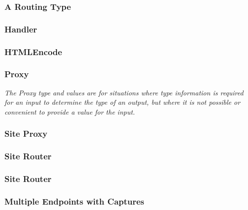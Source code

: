 \begin{frame}
  \frametitle{A Routing Type}
  
\end{frame}

\begin{frame}
  \frametitle{Handler}
  
\end{frame}

\begin{frame}
  \frametitle{HTMLEncode}
  
\end{frame}

\begin{frame}
  \frametitle{Proxy}
  \textit{
  The Proxy type and values are for situations where type information is
  required for an input to determine the type of an output, but where it is not
  possible or convenient to provide a value for the input.}
\end{frame}

\begin{frame}
  \frametitle{Site Proxy}
  
\end{frame}

\begin{frame}
  \frametitle{Site Router}
  
\end{frame}

\begin{frame}
  \frametitle{Site Router}
  
\end{frame}

\begin{frame}
\end{frame}

\begin{frame}
  \frametitle{Multiple Endpoints with Captures}
  
\end{frame}

